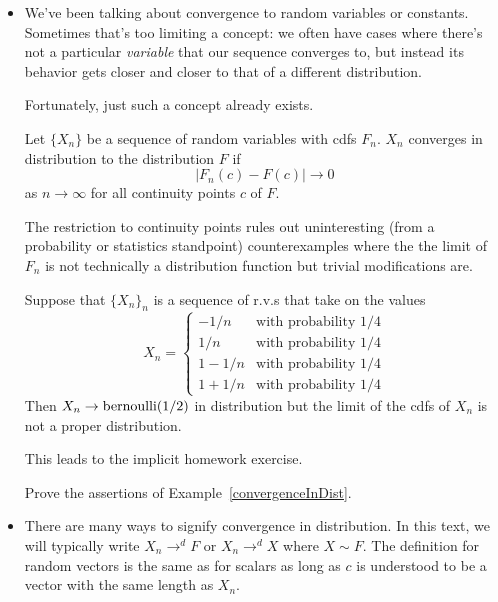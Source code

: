 \begin{itemize}[leftmargin=0pt]

\item We've been talking about convergence to random variables or
  constants.  Sometimes that's too limiting a concept: we often have
  cases where there's not a particular \emph{variable} that our
  sequence converges to, but instead its behavior gets closer and
  closer to that of a different distribution.

  Fortunately, just such a concept already exists.

  \begin{defn}
    Let $\{X_n\}$ be a sequence of random variables with cdfs $F_n$.
    $X_n$ converges in distribution to the distribution $F$ if
    \begin{equation*}
      \lvert F_n(c) - F(c) \rvert \to 0
    \end{equation*}
    as $n \to \infty$ for all continuity points $c$ of $F$.
  \end{defn}

  The restriction to continuity points rules out uninteresting (from a
  probability or statistics standpoint) counterexamples where the the
  limit of $F_n$ is not technically a distribution function but
  trivial modifications are.

  \begin{ex}\label{convergenceInDist}
    Suppose that $\{X_n\}_n$ is a sequence of r.v.s that take on the
    values
    \begin{equation*}
      X_n =
      \begin{cases}
        -1/n & \text{with probability 1/4} \\
        1/n  & \text{with probability 1/4} \\
        1 - 1/n & \text{with probability 1/4} \\
        1 + 1/n & \text{with probability 1/4}
      \end{cases}
    \end{equation*}
    Then $X_n \to \operatorname{bernoulli}(1/2)$ in distribution but the limit of the
    cdfs of $X_n$ is not a proper distribution.
  \end{ex}

  This leads to the implicit homework exercise.
  \begin{hw}
    Prove the assertions of Example~\ref{convergenceInDist}.
  \end{hw}

\item There are many ways to signify convergence in distribution.  In
  this text, we will typically write $X_n \to^d F$ or $X_n \to^d X$ where
  $X \sim F$.  The definition for random vectors is the same as for
  scalars as long as $c$ is understood to be a vector with the same
  length as $X_n$.


\end{itemize}
